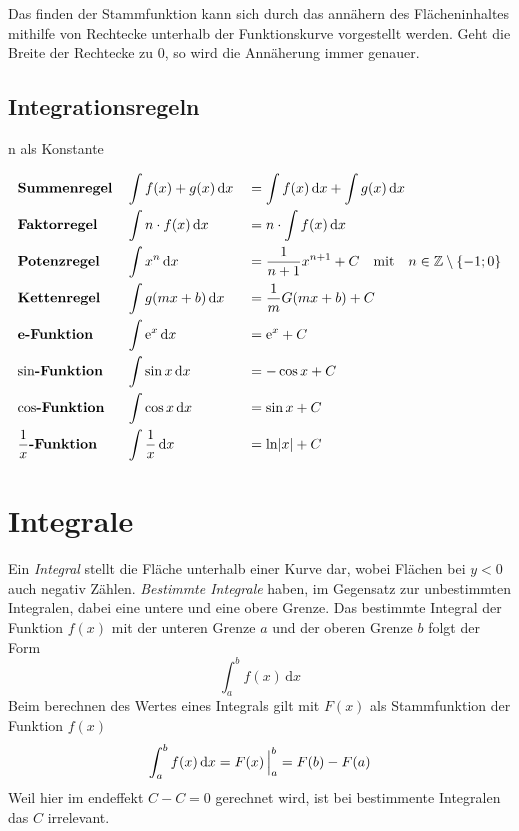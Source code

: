 \documentclass{article}
\begin{document}
Das finden der Stammfunktion kann sich durch das annähern des Flächeninhaltes mithilfe von Rechtecke unterhalb der Funktionskurve vorgestellt werden. Geht die Breite der Rechtecke zu $0$, so wird die Annäherung immer genauer.
 
\subsection{Integrationsregeln} 
$\mathrm{n}$ als Konstante 
\begin{multicols}{2} %
 \noindent \begin{align*}
  &\text{\textbf{Summenregel}} &&\int f(x) + g(x) \,\mathrm{d}{x} &&= \int f(x) \,\mathrm{d}{x} + \int g(x) \,\mathrm{d}{x} \\ 
  &\text{\textbf{Faktorregel}} &&\int n \cdot f(x) \,\mathrm{d}{x} &&= n \cdot \int f(x) \,\mathrm{d}{x} \\
  &\text{\textbf{Potenzregel}} &&\int x^n \,\mathrm{d}{x} &&= \frac{1}{n+1}x^{n+1} + C \quad \text{mit} \quad n \in \mathbb{Z} \setminus \{-1; 0\} \\
  &\text{\textbf{Kettenregel}} &&\int g(mx+b) \,\mathrm{d}{x} &&= \frac{1}{m} G(mx+b) + C \\     
  &\text{\textbf{e-Funktion}} &&\int \mathrm{e}^x \,\mathrm{d}{x} &&= \mathrm{e}^x + C \\
  &\text{\textbf{$\sin$-Funktion}} &&\int \sin x \,\mathrm{d}{x} &&= -\cos x + C \\
  &\text{\textbf{$\cos$-Funktion}} &&\int \cos x \,\mathrm{d}{x} &&= \sin x + C \\
  &\text{\textbf{$\frac{1}{x}$-Funktion}} &&\int \frac{1}{x} \,\mathrm{d}{x} &&= \ln \lvert x \rvert + C \\
 \end{align*} 
\end{multicols}
 
\section{Integrale}  
Ein \emph{Integral} stellt die Fläche unterhalb einer Kurve dar, wobei Flächen bei $y<0$ auch negativ Zählen. \emph{Bestimmte Integrale} haben, im Gegensatz zur unbestimmten Integralen, dabei eine untere und eine obere Grenze. Das bestimmte Integral der Funktion $f(x)$ mit der unteren Grenze $a$ und der oberen Grenze $b$ folgt der Form 
\[
 \int_a^b f(x) \,\mathrm{d}x
\]
Beim berechnen des Wertes eines Integrals gilt mit $F(x)$ als Stammfunktion der Funktion $f(x)$
\[
 \int_a^b f(x) \,\mathrm{d}{x} =
 F(x) \,\Bigr|_a^b =
 F(b) - F(a)
\] 
Weil hier im endeffekt $C-C=0$ gerechnet wird, ist bei bestimmente Integralen das $C$ irrelevant.
 
\end{document}
